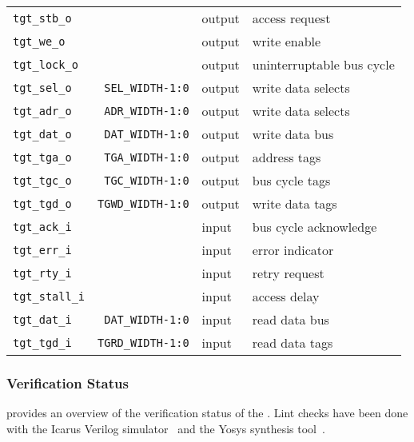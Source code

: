 \begin{center}
\begin{longtable}{|l|r|l|l|}
    \texttt{tgt\_stb\_o}         &                          & output & access request            \\
    \texttt{tgt\_we\_o}          &                          & output & write enable              \\
    \texttt{tgt\_lock\_o}        &                          & output & uninterruptable bus cycle \\
    \texttt{tgt\_sel\_o}         & \texttt{SEL\_WIDTH-1:0}  & output & write data selects        \\
    \texttt{tgt\_adr\_o}         & \texttt{ADR\_WIDTH-1:0}  & output & write data selects        \\
    \texttt{tgt\_dat\_o}         & \texttt{DAT\_WIDTH-1:0}  & output & write data bus            \\
    \texttt{tgt\_tga\_o}         & \texttt{TGA\_WIDTH-1:0}  & output & address tags              \\
    \texttt{tgt\_tgc\_o}         & \texttt{TGC\_WIDTH-1:0}  & output & bus cycle tags            \\
    \texttt{tgt\_tgd\_o}         & \texttt{TGWD\_WIDTH-1:0} & output & write data tags           \\
    \texttt{tgt\_ack\_i}         &                          & input  & bus cycle acknowledge     \\
    \texttt{tgt\_err\_i}         &                          & input  & error indicator           \\
    \texttt{tgt\_rty\_i}         &                          & input  & retry request             \\
    \texttt{tgt\_stall\_i}       &                          & input  & access delay              \\
    \texttt{tgt\_dat\_i}         & \texttt{DAT\_WIDTH-1:0}  & input  & read data bus             \\
    \texttt{tgt\_tgd\_i}         & \texttt{TGRD\_WIDTH-1:0} & input  & read data tags            \\   
  \end{longtable}
\end{center}  
\endgroup

\subsubsection{Verification Status}
\label{arb:verif}

 provides an overview of the verification status of the .
Lint checks have been done with the Icarus Verilog simulator~\cite{iverilog} and the Yosys synthesis tool~\cite{yosys}.

